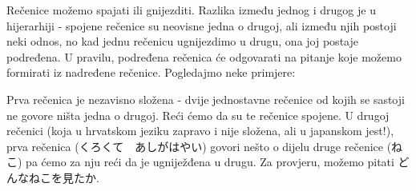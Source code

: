 
\author{Tomislav Mamić}

	
	
	Rečenice možemo spajati ili gnijezditi. Razlika između jednog i drugog je u hijerarhiji - spojene rečenice su neovisne jedna o drugoj, ali između njih postoji neki odnos, no kad jednu rečenicu ugnijezdimo u drugu, ona joj postaje podređena. U pravilu, podređena rečenica će odgovarati na pitanje koje možemo formirati iz nadređene rečenice. Pogledajmo neke primjere:
	
	\begin{reibun}
	\end{reibun}

	Prva rečenica je nezavisno složena - dvije jednostavne rečenice od kojih se sastoji ne govore ništa jedna o drugoj. Reći ćemo da su te rečenice spojene. U drugoj rečenici (koja u hrvatskom jeziku zapravo i nije složena, ali u japanskom jest!), prva rečenica (くろくて　あしがはやい) govori nešto o dijelu druge rečenice (ねこ) pa ćemo za nju reći da je ugniježđena u drugu. Za provjeru, možemo pitati どんなねこを見たか.
	
